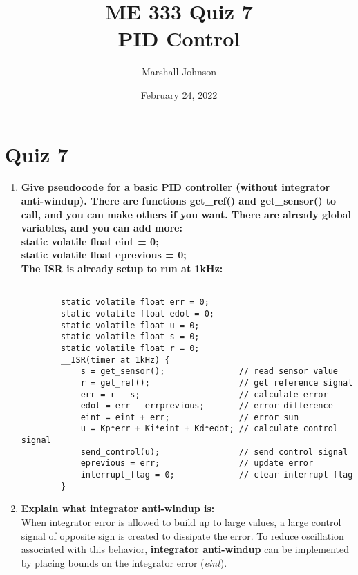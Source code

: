 \documentclass{article}
\title{ME 333 Quiz 7 \\ [1ex] \large PID Control}
\author{Marshall Johnson}
\date{February 24, 2022}
\begin{document}
\maketitle

\section*{Quiz 7}

\begin{enumerate}[label=\textbf{\arabic*})]
    \item \textbf{Give pseudocode for a basic PID controller (without integrator anti-windup). 
    There are functions get\_ref() and get\_sensor() to call, and you can make others if you want. 
    There are already global variables, and you can add more: \\
    static volatile float eint = 0; \\ 
    static volatile float eprevious = 0; \\  
    The ISR is already setup to run at 1kHz:} \\

     \begin{lstlisting}

        static volatile float err = 0;
        static volatile float edot = 0;
        static volatile float u = 0;
        static volatile float s = 0;
        static volatile float r = 0;
        __ISR(timer at 1kHz) {
            s = get_sensor();               // read sensor value
            r = get_ref();                  // get reference signal
            err = r - s;                    // calculate error
            edot = err - errprevious;       // error difference
            eint = eint + err;              // error sum
            u = Kp*err + Ki*eint + Kd*edot; // calculate control signal
            send_control(u);                // send control signal
            eprevious = err;                // update error
            interrupt_flag = 0;             // clear interrupt flag
        }
     \end{lstlisting}

     \item \textbf{Explain what integrator anti-windup is: } \\
     
     When integrator error is allowed to build up to large values, a large control signal
     of opposite sign is created to dissipate the error. To reduce oscillation associated
     with this behavior, \textbf{integrator anti-windup} can be implemented by placing 
     bounds on the integrator error (\textit{eint}).


\end{enumerate}
\end{document}
